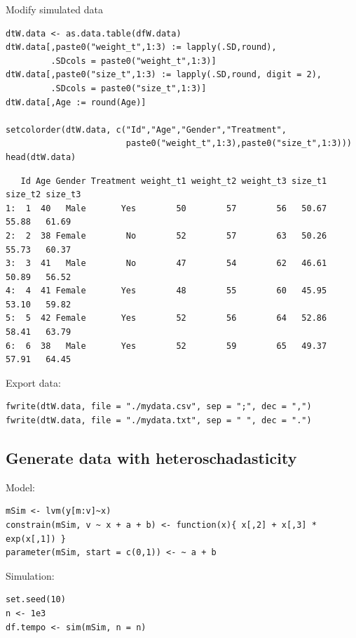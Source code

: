 \documentclass{article}
\begin{document}
Modify simulated data 
\lstset{language=r,label= ,caption= ,captionpos=b,numbers=none}
\begin{lstlisting}
dtW.data <- as.data.table(dfW.data)
dtW.data[,paste0("weight_t",1:3) := lapply(.SD,round),
		 .SDcols = paste0("weight_t",1:3)]
dtW.data[,paste0("size_t",1:3) := lapply(.SD,round, digit = 2),
		 .SDcols = paste0("size_t",1:3)]
dtW.data[,Age := round(Age)]

setcolorder(dtW.data, c("Id","Age","Gender","Treatment",
						paste0("weight_t",1:3),paste0("size_t",1:3)))
head(dtW.data)
\end{lstlisting}

\begin{verbatim}
   Id Age Gender Treatment weight_t1 weight_t2 weight_t3 size_t1 size_t2 size_t3
1:  1  40   Male       Yes        50        57        56   50.67   55.88   61.69
2:  2  38 Female        No        52        57        63   50.26   55.73   60.37
3:  3  41   Male        No        47        54        62   46.61   50.89   56.52
4:  4  41 Female       Yes        48        55        60   45.95   53.10   59.82
5:  5  42 Female       Yes        52        56        64   52.86   58.41   63.79
6:  6  38   Male       Yes        52        59        65   49.37   57.91   64.45
\end{verbatim}

Export data:
\lstset{language=r,label= ,caption= ,captionpos=b,numbers=none}
\begin{lstlisting}
fwrite(dtW.data, file = "./mydata.csv", sep = ";", dec = ",")
fwrite(dtW.data, file = "./mydata.txt", sep = " ", dec = ".")
\end{lstlisting}

\subsection{Generate data with heteroschadasticity}
\label{sec:org1994fe4}

Model:
\lstset{language=r,label= ,caption= ,captionpos=b,numbers=none}
\begin{lstlisting}
mSim <- lvm(y[m:v]~x)
constrain(mSim, v ~ x + a + b) <- function(x){ x[,2] + x[,3] * exp(x[,1]) }
parameter(mSim, start = c(0,1)) <- ~ a + b
\end{lstlisting}

Simulation:
\lstset{language=r,label= ,caption= ,captionpos=b,numbers=none}
\begin{lstlisting}
set.seed(10)
n <- 1e3
df.tempo <- sim(mSim, n = n)
\end{lstlisting}
\end{document}
